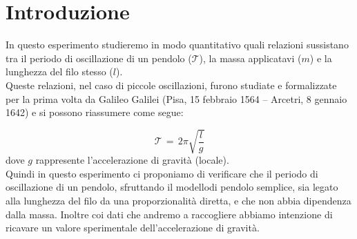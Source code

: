 \section{Introduzione}


In questo esperimento studieremo in modo quantitativo quali relazioni sussistano tra il periodo di oscillazione di un pendolo ($\mathcal{T}$), la massa applicatavi ($m$) e la lunghezza del filo stesso ($l$).\\
Queste relazioni, nel caso di piccole oscillazioni, furono studiate e formalizzate per la prima volta da Galileo Galilei (Pisa, 15 febbraio 1564 – Arcetri, 8 gennaio 1642) e si possono riassumere come segue:

\begin{equation}
	\mathcal{T} \,=\, 2\pi\sqrt{\frac{l}{g}} 
\end{equation}
%
dove $g$ rappresente l'accelerazione di gravità (locale).\\
Quindi in questo esperimento ci proponiamo di verificare che il periodo di oscillazione di un pendolo, sfruttando il modellodi pendolo semplice, sia legato alla lunghezza del filo da una proporzionalità diretta, e che non abbia dipendenza dalla massa.
Inoltre coi dati che andremo a raccogliere abbiamo intenzione di ricavare un valore sperimentale dell'accelerazione di gravità.